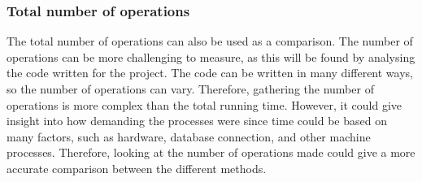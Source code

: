\subsubsection{Total number of operations}
The total number of operations can also be used as a comparison.
The number of operations can be more challenging to measure, as this will be found by analysing the code written for the project. The code can be written in many different ways, so the number of operations can vary. Therefore, gathering the number of operations is more complex than the total running time. However, it could give insight into how demanding the processes were since time could be based on many factors, such as hardware, database connection, and other machine processes. Therefore, looking at the number of operations made could give a more accurate comparison between the different methods.